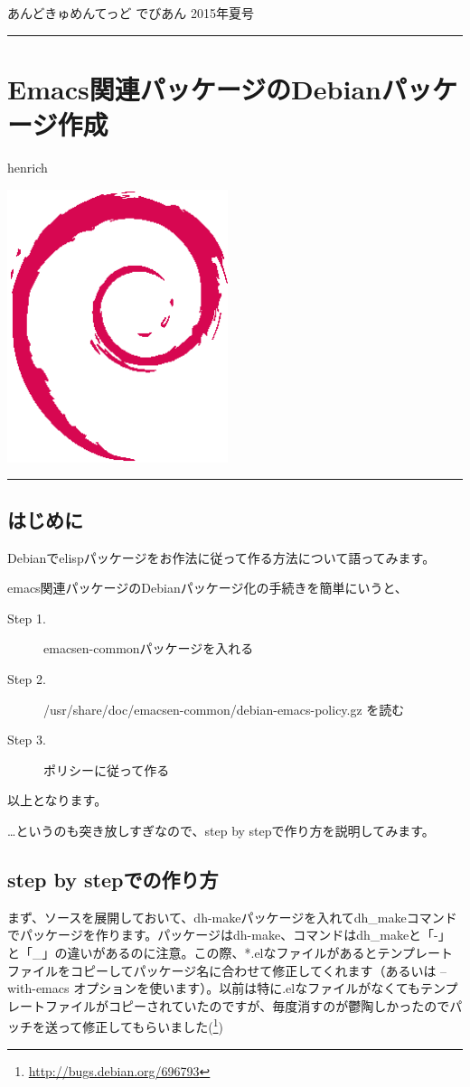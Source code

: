 \documentclass[mingoth,a4paper]{jsarticle}
\renewcommand{\dancersection}[2]{%
\newpage
あんどきゅめんてっど でびあん 2015年夏号
%
\vspace{0.1mm}\\
{\color{dancerdarkblue}\rule{\hsize}{2mm}}

%
%
\begin{minipage}[t]{0.6\hsize}
\color{dancerdarkblue}
\vspace{1cm}
\section{#1}
\hfill{}#2\\
\end{minipage}
\begin{minipage}[t]{0.4\hsize}
\vspace{-2cm}
\hfill{}\includegraphics[height=8cm]{image200502/openlogo-nd.eps}\\
\vspace{-5cm}
\end{minipage}
%
{\color{dancerlightblue}\rule{0.66\hsize}{2mm}}
%
\vspace{2cm}
}
\begin{document}
\dancersection{Emacs関連パッケージのDebianパッケージ作成}{henrich}

\subsection{はじめに}

 Debianでelispパッケージをお作法に従って作る方法について語ってみます。

 emacs関連パッケージのDebianパッケージ化の手続きを簡単にいうと、

\begin{description}
\item [Step 1.] emacsen-commonパッケージを入れる
\item [Step 2.] /usr/share/doc/emacsen-common/debian-emacs-policy.gz を読む
\item [Step 3.] ポリシーに従って作る
\end{description}

以上となります。

…というのも突き放しすぎなので、step by stepで作り方を説明してみます。

\subsection{step by stepでの作り方}

 まず、ソースを展開しておいて、dh-makeパッケージを入れてdh\_makeコマンドでパッケージを作ります。パッケージはdh-make、コマンドはdh\_makeと「-」と「\_」の違いがあるのに注意。この際、*.elなファイルがあるとテンプレートファイルをコピーしてパッケージ名に合わせて修正してくれます（あるいは --with-emacs オプションを使います）。以前は特に.elなファイルがなくてもテンプレートファイルがコピーされていたのですが、毎度消すのが鬱陶しかったのでパッチを送って修正してもらいました(\footnote{\url{http://bugs.debian.org/696793}})
\end{document}
